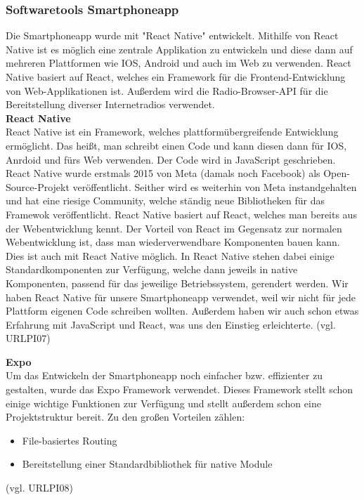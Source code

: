 \documentclass[]{article}
\begin{document}
\subsubsection{Softwaretools Smartphoneapp}
Die Smartphoneapp wurde mit "React Native" entwickelt. Mithilfe von React Native ist es möglich eine zentrale Applikation zu entwickeln und diese dann auf mehreren Plattformen wie IOS, Android und auch im Web zu verwenden. React Native basiert auf React, welches ein Framework für die Frontend-Entwicklung von Web-Applikationen ist. Außerdem wird die Radio-Browser-API für die Bereitstellung diverser Internetradios verwendet. \\

\textbf{React Native} \\
React Native ist ein Framework, welches plattformübergreifende Entwicklung ermöglicht. Das heißt, man schreibt einen Code und kann diesen dann für IOS, Anrdoid und fürs Web verwenden. Der Code wird in JavaScript geschrieben. React Native wurde erstmals 2015 von Meta (damals noch Facebook) als Open-Source-Projekt veröffentlicht. Seither wird es weiterhin von Meta instandgehalten und hat eine riesige Community, welche ständig neue Bibliotheken für das Framewok veröffentlicht. React Native basiert auf React, welches man bereits aus der Webentwicklung kennt. Der Vorteil von React im Gegensatz zur normalen Webentwicklung ist, dass man wiederverwendbare Komponenten bauen kann. Dies ist auch mit React Native möglich. In React Native stehen dabei einige Standardkomponenten zur Verfügung, welche dann jeweils in native Komponenten, passend für das jeweilige Betriebssystem, gerendert werden. 
Wir haben React Native für unsere Smartphoneapp verwendet, weil wir nicht für jede Plattform eigenen Code schreiben wollten. Außerdem haben wir auch schon etwas Erfahrung mit JavaScript und React, was uns den Einstieg erleichterte.
(vgl. URLPI07)

\textbf{Expo} \\
Um das Entwickeln der Smartphoneapp noch einfacher bzw. effizienter zu gestalten, wurde das Expo Framework verwendet. Dieses Framework stellt schon einige wichtige Funktionen zur Verfügung und stellt außerdem schon eine Projektstruktur bereit. Zu den großen Vorteilen zählen:
\begin{itemize}
\item File-basiertes Routing
\item Bereitstellung einer Standardbibliothek  für native Module
\end{itemize}
(vgl. URLPI08)
\end{document}
